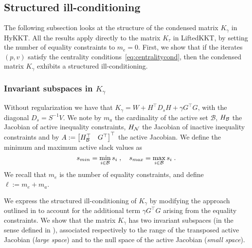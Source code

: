 \subsection{Structured ill-conditioning}
The following subsection looks at the structure
of the condensed matrix $K_\gamma$ in HyKKT. All the results
apply directly to the matrix $K_\tau$ in LiftedKKT, by setting the number
of equality constraints to $m_e = 0$.
First, we show that if the iterates $(p, v)$ satisfy
the centrality conditions~\eqref{eq:centralitycond}, then the
condensed matrix $K_\gamma$ exhibits a structured ill-conditioning.

\subsubsection{Invariant subspaces in $K_\gamma$}
Without regularization we have that $K_\gamma = W + H^\top D_s H + \gamma G^\top G$, with
the diagonal $D_s = S^{-1} V$.
We note by $m_a$ the cardinality of the active set $\mathcal{B}$,
$H_{\mathcal{B}}$ the Jacobian of active inequality constraints, $H_{\mathcal{N}}$ the
Jacobian of inactive inequality constraints and by
$A := \begin{bmatrix} H_{\mathcal{B}}^\top & G^\top \end{bmatrix}^\top$ the active Jacobian.
We define the minimum and maximum active slack values as
\begin{equation}
  s_{min} = \min_{i \in \mathcal{B}} s_i \; , \quad
  s_{max} = \max_{i \in \mathcal{B}} s_i \; .
\end{equation}
We recall that $m_e$ is the number of equality constraints,
and define $\ell := m_e + m_a$.

We express the structured ill-conditioning of $K_\gamma$ by
modifying the approach outlined in \cite[Theorem 3.2]{wright1998ill} to account for the additional
term $\gamma G^\top G$ arising from the equality constraints.
We show that the matrix $K_\gamma$ has two invariant subspaces
(in the sense defined in \cite[Chapter 5]{stewart1990matrix}),
associated respectively to the range of the transposed active Jacobian
(\emph{large space}) and to the null space of the active Jacobian (\emph{small space}).

